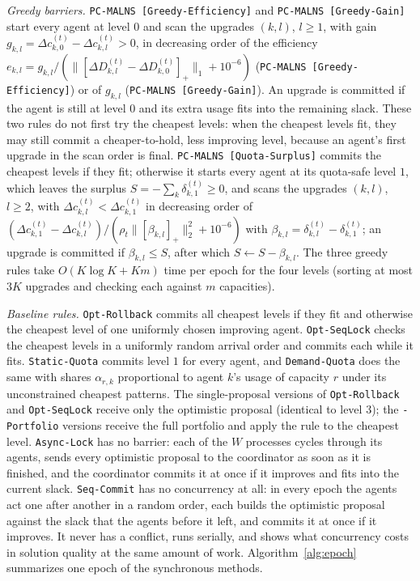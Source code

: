 \documentclass[a4paper,fleqn]{cas-sc}
\newcommand{\pge}{\texttt{PC-MALNS [Greedy-Efficiency]}}
\newcommand{\pqs}{\texttt{PC-MALNS [Quota-Surplus]}}
\newcommand{\pgg}{\texttt{PC-MALNS [Greedy-Gain]}}
\begin{document}
\textit{Greedy barriers.} \pge{} and \pgg{} start every agent at level $0$ and scan the upgrades $(k,l)$, $l \ge 1$, with gain $g_{k,l} = \Delta c_{k,0}^{(t)} - \Delta c_{k,l}^{(t)} > 0$, in decreasing order of the efficiency $e_{k,l} = g_{k,l} / (\|[\Delta D_{k,l}^{(t)} - \Delta D_{k,0}^{(t)}]_+\|_1 + 10^{-6})$ (\pge) or of $g_{k,l}$ (\pgg). An upgrade is committed if the agent is still at level $0$ and its extra usage fits into the remaining slack. These two rules do not first try the cheapest levels: when the cheapest levels fit, they may still commit a cheaper-to-hold, less improving level, because an agent's first upgrade in the scan order is final. \pqs{} commits the cheapest levels if they fit; otherwise it starts every agent at its quota-safe level $1$, which leaves the surplus $S = -\sum_k \delta_{k,1}^{(t)} \ge 0$, and scans the upgrades $(k,l)$, $l \ge 2$, with $\Delta c_{k,l}^{(t)} < \Delta c_{k,1}^{(t)}$ in decreasing order of $(\Delta c_{k,1}^{(t)} - \Delta c_{k,l}^{(t)}) / (\rho_t \|[\beta_{k,l}]_+\|_2^2 + 10^{-6})$ with $\beta_{k,l} = \delta_{k,l}^{(t)} - \delta_{k,1}^{(t)}$; an upgrade is committed if $\beta_{k,l} \le S$, after which $S \leftarrow S - \beta_{k,l}$. The three greedy rules take $O(K \log K + Km)$ time per epoch for the four levels (sorting at most $3K$ upgrades and checking each against $m$ capacities).

\textit{Baseline rules.} \texttt{Opt-Rollback} commits all cheapest levels if they fit and otherwise the cheapest level of one uniformly chosen improving agent. \texttt{Opt-SeqLock} checks the cheapest levels in a uniformly random arrival order and commits each while it fits. \texttt{Static-Quota} commits level $1$ for every agent, and \texttt{Demand-Quota} does the same with shares $\alpha_{r,k}$ proportional to agent $k$'s usage of capacity $r$ under its unconstrained cheapest patterns. The single-proposal versions of \texttt{Opt-Rollback} and \texttt{Opt-SeqLock} receive only the optimistic proposal (identical to level $3$); the \texttt{-Portfolio} versions receive the full portfolio and apply the rule to the cheapest level. \texttt{Async-Lock} has no barrier: each of the $W$ processes cycles through its agents, sends every optimistic proposal to the coordinator as soon as it is finished, and the coordinator commits it at once if it improves and fits into the current slack. \texttt{Seq-Commit} has no concurrency at all: in every epoch the agents act one after another in a random order, each builds the optimistic proposal against the slack that the agents before it left, and commits it at once if it improves. It never has a conflict, runs serially, and shows what concurrency costs in solution quality at the same amount of work. Algorithm~\ref{alg:epoch} summarizes one epoch of the synchronous methods.
\end{document}
